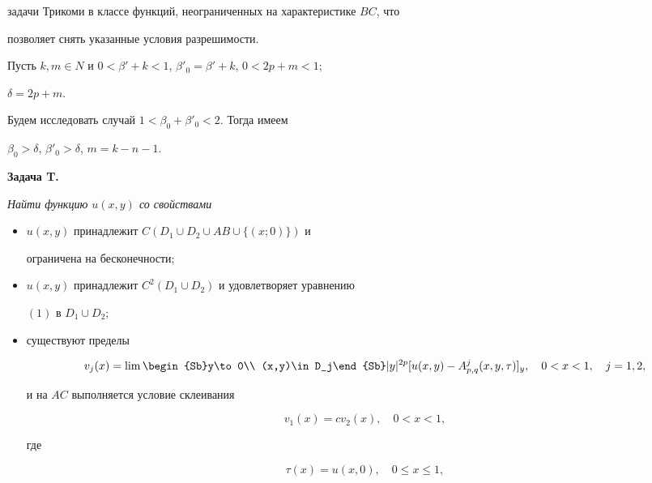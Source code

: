 задачи Трикоми в классе функций, неограниченных на характеристике $BC$, что 


позволяет снять указанные условия разрешимости. 


 


Пусть $k,m\in N$ и $0<\beta'+k<1$, $\beta'_0=\beta'+k$, $0<2p+m<1$; 


$\delta=2p+m$. 


Будем исследовать случай $1<\beta_0+\beta'_0<2$. Тогда имеем 


$\beta_0>\delta$, $\beta'_0>\delta$, $m=k-n-1$. 


\medskip 


 


{\bf Задача T.} {\it Найти функцию $u(x,y)$ со свойствами 


\begin{itemize} 


\item[1)] $u(x,y)$ принадлежит $C(D_1\cup D_2\cup AB\cup\{(x;0)\})$ и 


ограничена на бесконечности\/$;$ 


\item[2)] $u(x,y)$ принадлежит $C^2(D_1\cup D_2)$ и удовлетворяет уравнению 


$(1)$ в $D_1\cup D_2;$ 


\item[3)] существуют пределы 


\begin{equation} 


v_j(x)=\lim\begin{Sb}y\to0\\ (x,y)\in D_j\end{Sb}|y|^{2p} 


[u(x,y)-A^j_{p,q}(x,y,\tau)]_y,\quad 0<x<1, \quad j=1,2,


\end{equation} 


и на $AC$ выполняется условие склеивания 


\begin{equation} 


v_1(x)=cv_2(x),\quad 0<x<1, 


\end{equation} 


где 


\begin{equation} 


\tau(x)=u(x,0),\quad 0\le x\le 1, 



\end{equation}
\end{itemize}}
